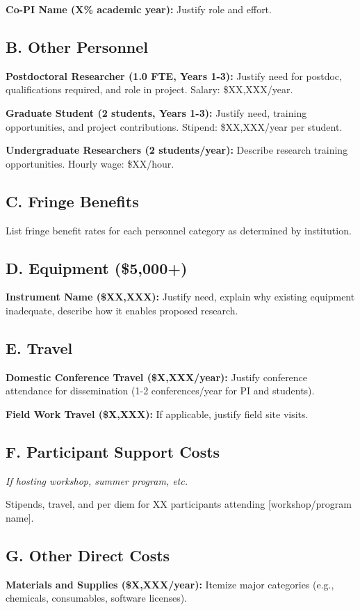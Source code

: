 \documentclass[11pt,letterpaper]{article}
\begin{document}
\textbf{Co-PI Name (X\% academic year):} Justify role and effort.

\subsection*{B. Other Personnel}
\textbf{Postdoctoral Researcher (1.0 FTE, Years 1-3):} Justify need for postdoc, qualifications required, and role in project. Salary: \$XX,XXX/year.

\textbf{Graduate Student (2 students, Years 1-3):} Justify need, training opportunities, and project contributions. Stipend: \$XX,XXX/year per student.

\textbf{Undergraduate Researchers (2 students/year):} Describe research training opportunities. Hourly wage: \$XX/hour.

\subsection*{C. Fringe Benefits}
List fringe benefit rates for each personnel category as determined by institution.

\subsection*{D. Equipment (\$5,000+)}
\textbf{Instrument Name (\$XX,XXX):} Justify need, explain why existing equipment inadequate, describe how it enables proposed research.

\subsection*{E. Travel}
\textbf{Domestic Conference Travel (\$X,XXX/year):} Justify conference attendance for dissemination (1-2 conferences/year for PI and students).

\textbf{Field Work Travel (\$X,XXX):} If applicable, justify field site visits.

\subsection*{F. Participant Support Costs}
\textit{If hosting workshop, summer program, etc.}

Stipends, travel, and per diem for XX participants attending [workshop/program name].

\subsection*{G. Other Direct Costs}
\textbf{Materials and Supplies (\$X,XXX/year):} Itemize major categories (e.g., chemicals, consumables, software licenses).
\end{document}
